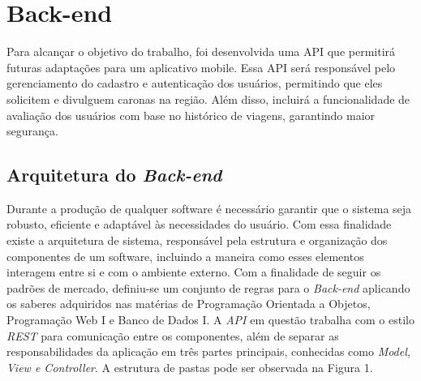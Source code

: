 \section{Back-end}

Para alcançar o objetivo do trabalho, foi desenvolvida uma API que permitirá futuras adaptações para um aplicativo mobile. Essa API será responsável pelo gerenciamento do cadastro e autenticação dos usuários, permitindo que eles solicitem e divulguem caronas na região. Além disso, incluirá a funcionalidade de avaliação dos usuários com base no histórico de viagens, garantindo maior segurança.

\subsection{Arquitetura do \textit{Back-end}}

Durante a produção de qualquer software é necessário garantir que o sistema seja robusto, eficiente e adaptável às necessidades do usuário. Com essa finalidade existe a arquitetura de sistema, responsável pela estrutura e organização dos componentes de um software, incluindo a maneira como esses elementos interagem entre si e com o ambiente externo. Com a finalidade de seguir os padrões de mercado, definiu-se um conjunto de regras para o \textit{Back-end} aplicando os saberes adquiridos nas matérias de Programação Orientada a Objetos, Programação Web I e Banco de Dados I. A \textit{API} em questão trabalha com o estilo \textit{REST} para comunicação entre os componentes, além de separar as responsabilidades da aplicação em três partes principais, conhecidas como \textit{Model, View e Controller}. A estrutura de pastas pode ser observada na Figura 1.

